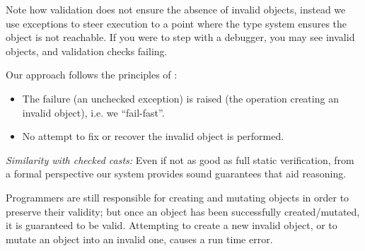 Note how validation does not ensure the absence of invalid objects, instead we use exceptions to steer execution to a point where the type system ensures the object is not reachable.
If you were to step with a debugger, you may see invalid objects, and validation checks failing.

\noindent Our approach follows the principles of :
\begin{itemize}
\item The failure (an unchecked exception)
is raised  (the operation creating an invalid object), i.e. we ``fail-fast''.
\item No attempt to fix or recover the invalid object is performed.
\end{itemize}


%
\noindent\textit{Similarity with checked casts:}
Even if not as good as full static verification, from a formal perspective
our system provides sound guarantees that aid reasoning.

Programmers are still responsible for creating and mutating objects in order to preserve their validity;
but once an object has been successfully created/mutated, it is guaranteed to be valid.
Attempting to create a new invalid object, or to mutate an object into an invalid one, causes
a run time error.

